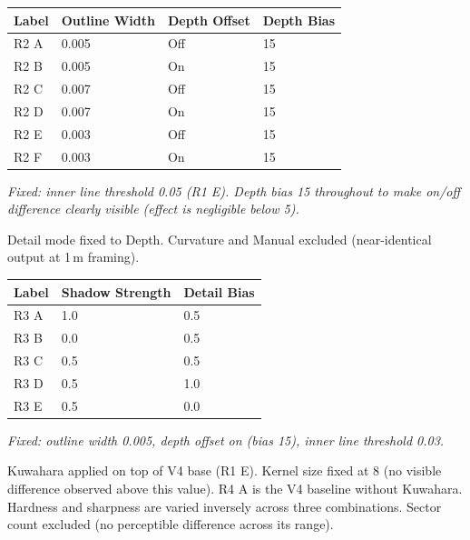 \documentclass[11pt,a4paper]{article}
\begin{document}
\bigskip


\smallskip
\begin{tabular}{llll}
\toprule
\textbf{Label} & \textbf{Outline Width} & \textbf{Depth Offset} & \textbf{Depth Bias} \\
\midrule
R2 A & 0.005 & Off & 15 \\
R2 B & 0.005 & On  & 15 \\
R2 C & 0.007 & Off & 15 \\
R2 D & 0.007 & On  & 15 \\
R2 E & 0.003 & Off & 15 \\
R2 F & 0.003 & On  & 15 \\
\bottomrule
\end{tabular}

\smallskip
\noindent\textit{Fixed: inner line threshold 0.05 (R1 E). Depth bias 15 throughout to make on/off difference clearly visible (effect is negligible below 5).}

\bigskip


\noindent Detail mode fixed to Depth. Curvature and Manual excluded (near-identical output at 1\,m framing).

\smallskip
\begin{tabular}{lll}
\toprule
\textbf{Label} & \textbf{Shadow Strength} & \textbf{Detail Bias} \\
\midrule
R3 A & 1.0 & 0.5 \\
R3 B & 0.0 & 0.5 \\
R3 C & 0.5 & 0.5 \\
R3 D & 0.5 & 1.0 \\
R3 E & 0.5 & 0.0 \\
\bottomrule
\end{tabular}

\smallskip
\noindent\textit{Fixed: outline width 0.005, depth offset on (bias 15), inner line threshold 0.03.}

\bigskip


\noindent Kuwahara applied on top of V4 base (R1 E). Kernel size fixed at 8 (no visible difference observed above this value). R4 A is the V4 baseline without Kuwahara. Hardness and sharpness are varied inversely across three combinations. Sector count excluded (no perceptible difference across its range).
\end{document}
